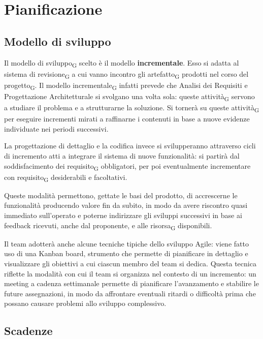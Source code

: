 \section{Pianificazione}

\subsection{Modello di sviluppo}

Il modello di sviluppo\textsubscript{G} scelto è il modello \textbf{incrementale}. Esso si adatta al sistema di revisione\textsubscript{G} a cui vanno incontro gli artefatto\textsubscript{G} prodotti nel corso del progetto\textsubscript{G}. Il modello incrementale\textsubscript{G} infatti prevede che Analisi dei Requisiti e Progettazione Architetturale si svolgano una volta sola: queste attività\textsubscript{G} servono a studiare il problema e a strutturarne la soluzione. Si tornerà su queste attività\textsubscript{G} per eseguire incrementi mirati a raffinarne i contenuti in base a nuove evidenze individuate nei periodi successivi.

La progettazione di dettaglio e la codifica invece si svilupperanno attraverso cicli di incremento atti a integrare il sistema di nuove funzionalità: si partirà dal soddisfacimento dei requisito\textsubscript{G} obbligatori, per poi eventualmente incrementare con requisito\textsubscript{G} desiderabili e facoltativi. 

Queste modalità permettono, gettate le basi del prodotto, di accrescerne le funzionalità producendo valore fin da subito, in modo da avere riscontro quasi immediato sull'operato e poterne indirizzare gli sviluppi successivi in base ai feedback ricevuti, anche dal proponente, e alle risorsa\textsubscript{G} disponibili.

Il team adotterà anche alcune tecniche tipiche dello sviluppo Agile: viene fatto uso di una Kanban board, strumento che permette di pianificare in dettaglio e visualizzare gli obiettivi a cui ciascun membro del team si dedica. Questa tecnica riflette la modalità con cui il team si organizza nel contesto di un incremento: un meeting a cadenza settimanale permette di pianificare l'avanzamento e stabilire le future assegnazioni, in modo da affrontare eventuali ritardi o difficoltà prima che possano causare problemi allo sviluppo complessivo.



\subsection{Scadenze}

